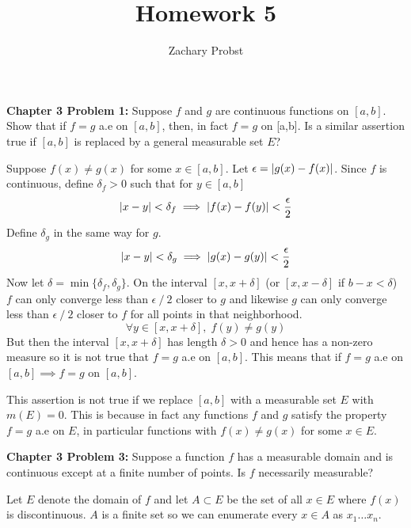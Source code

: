 \documentclass[11pt]{article}
\title{Homework 5}
\author{Zachary Probst}
\DeclarePairedDelimiter{\card}{\lvert}{\rvert}
\begin{document}
    \maketitle

    \begin{mybox}
        \textbf{Chapter 3 Problem 1:} Suppose $f$ and $g$ are continuous functions on $[a,b]$.
        Show that if $f = g$ a.e on $[a,b]$, then, in fact $f = g$ on [a,b].
        Is a similar assertion true if $[a,b]$ is replaced by a general measurable set $E$?
    \end{mybox}

    Suppose $f(x) \neq g(x)$ for some $x \in [a,b]$.
    Let $\epsilon = \card{g(x) - f(x)}$.
    Since $f$ is continuous, define $\delta_f > 0$ such that for $y \in [a,b]$
    \[
        \card{x - y} < \delta_f\implies \card{f(x) - f(y)} < \frac{\epsilon}{2}
    \]
    Define $\delta_g$ in the same way for $g$.
    \[
        \card{x - y} < \delta_g \implies \card{g(x) - g(y)} < \frac{\epsilon}{2}
    \]
    Now let $\delta = \min \{ \delta_f, \delta_g \}$.
    On the interval $[x,x+\delta]$ (or $[x,x-\delta]$ if $b - x < \delta$) $f$ can only converge less than $\epsilon \mathbin{/} 2$ closer to $g$ and likewise $g$ can only converge less than $\epsilon \mathbin{/} 2$ closer to $f$ for all points in that neighborhood.
    \[
        \forall y \in [x, x + \delta], \; f(y) \neq g(y)
    \]
    But then the interval $[x, x+ \delta]$ has length $\delta > 0$ and hence has a non-zero measure so it is not true that $f = g$ a.e on $[a,b]$.
    This means that if $f = g$ a.e on $[a,b] \implies f = g $ on $[a,b]$.

    This assertion is not true if we replace $[a,b]$ with a measurable set $E$ with $m(E) = 0$.
    This is because in fact any functions $f$ and $g$ satisfy the property $f = g$ a.e on $E$, in particular functions with $f(x) \neq g(x)$ for some $x \in E$.

    \clearpage

    \begin{mybox}
        \textbf{Chapter 3 Problem 3:} Suppose a function $f$ has a measurable domain and is continuous except at a finite number of points.
        Is $f$ necessarily measurable?
    \end{mybox}

    Let $E$ denote the domain of $f$ and let $A \subset E$ be the set of all $x \in E$ where $f(x)$ is discontinuous.
    $A$ is a finite set so we can enumerate every $x \in A$ as $x_1 \hdots x_n$.
\end{document}
